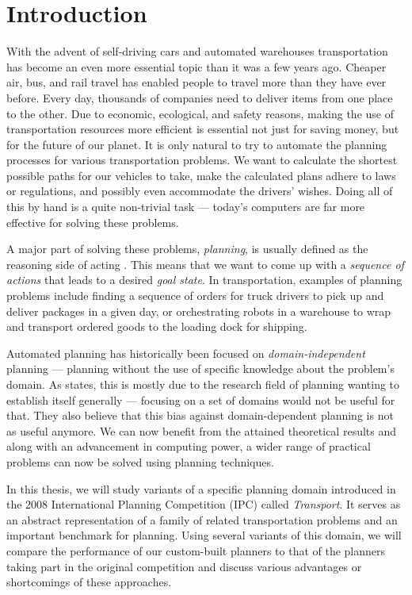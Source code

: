 \chapter*{Introduction}

With the advent of self-driving cars and automated warehouses transportation has become an even more essential topic than it was a few years ago.
Cheaper air, bus, and rail travel has enabled people to travel more than they have ever before.
Every day, thousands of companies need to deliver items from
one place to the other. Due to economic, ecological, and safety reasons, making the use of transportation resources more efficient is essential not just for saving money,
but for the future of our planet.
It is only natural to try to automate the planning processes for various transportation problems.
We want to calculate the shortest possible paths for our vehicles to take,
make the calculated plans adhere to laws or regulations, and possibly even accommodate the drivers'
wishes. Doing all of this by hand is a quite non-trivial task --- today's computers
are far more effective for solving these problems.

A major part of solving these problems, \textit{planning}, is usually defined as the reasoning side of acting \citep[Section~1.1]{Ghallab2004}.
This means that we want to come up with a \textit{sequence of actions} that leads to a desired \textit{goal state}.
In transportation, examples of planning problems include finding a sequence of orders for truck drivers to pick up and deliver packages in a given day,
or orchestrating robots in a warehouse to wrap and transport ordered goods to the loading dock for shipping.

Automated planning has historically been focused on \textit{domain-independent} planning --- planning without
the use of specific knowledge about the problem's domain.
As \citet{Nau2007} states, this is mostly due to the research field of planning wanting to
establish itself generally --- focusing on a set of domains would not be useful for that.
They also believe that this bias against domain-dependent planning is not as useful anymore.
We can now benefit from the attained theoretical results and along with an advancement in computing power,
a wider range of practical problems can now be solved using planning techniques.

In this thesis, we will study variants of a specific planning domain introduced in the 2008 International Planning Competition (IPC) called \textit{Transport}. It serves as an abstract representation of a family of related transportation problems
and an important benchmark for planning. Using several variants
of this domain, we will compare the performance of our custom-built planners to that of the planners taking part in the original competition and discuss various advantages or shortcomings of these approaches.

